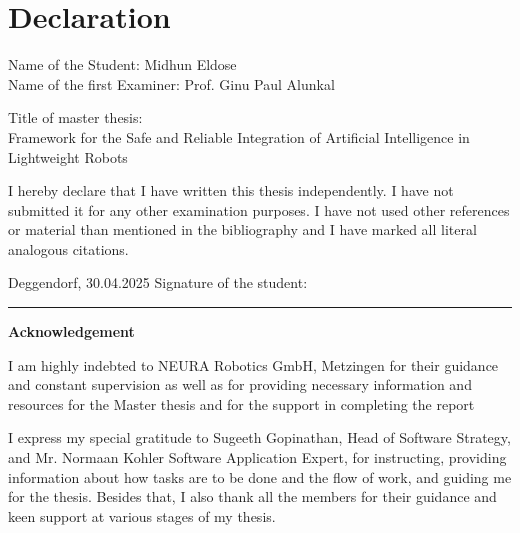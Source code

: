 \documentclass[12pt]{report}
\begin{document}
\newpage
\raggedright
\section*{Declaration}

\noindent
Name of the Student: Midhun Eldose\\
Name of the first Examiner: Prof. Ginu Paul Alunkal\\

\vspace{1 cm}

Title of master thesis:\\
Framework for the Safe and Reliable Integration of Artificial Intelligence in Lightweight Robots

\vspace{1.5 cm}

I hereby declare that I have written this thesis independently. I have not submitted it for any other examination purposes. I have not used other references or material than mentioned in the bibliography and I have marked all literal analogous citations.

\vspace{1.5 cm}

\noindent
Deggendorf, 30.04.2025 \hfill Signature of the student: \rule{6cm}{0.5pt} %

\newpage

\tableofcontents
\newpage
\listoffigures
{}
\newpage
\listoftables
{}
\newpage
\raggedright
{}
\begin{center}
    \textbf{Acknowledgement}
\end{center}
\raggedright

I am highly indebted to NEURA Robotics GmbH, Metzingen for their guidance and constant supervision as well as for providing necessary information and resources for the Master thesis and for the support in completing the report

\vspace{1cm}
    
I express my special gratitude to Sugeeth Gopinathan, Head of Software Strategy, and Mr. Normaan Kohler Software Application Expert, for instructing, providing information about how tasks are to be done and the flow of work, and guiding me for the thesis. Besides that, I also thank all the members for their guidance and keen support at various stages of my thesis.
\end{document}
